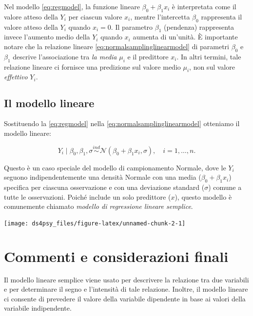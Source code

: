 \documentclass[
  11pt,
]{krantz}
\theoremstyle{definition}
\theoremstyle{definition}
\theoremstyle{definition}
\theoremstyle{definition}
\theoremstyle{remark}
\begin{document}
Nel modello \eqref{eq:regmodel}, la funzione lineare \(\beta_0 + \beta_ 1 x_i\) è interpretata come il valore atteso della \(Y_i\) per ciascun valore \(x_i\), mentre l'intercetta \(\beta_0\) rappresenta il valore atteso della \(Y_i\) quando \(x_i = 0\). Il parametro \(\beta_ 1\) (pendenza) rappresenta invece l'aumento medio della \(Y_i\) quando \(x_i\) aumenta di un'unità. È importante notare che la relazione lineare \eqref{eq:normalsamplinglinearmodel} di parametri \(\beta_0\) e \(\beta_ 1\) descrive l'associazione tra \emph{la media} \(\mu_i\) e il predittore \(x_i\). In altri termini, tale relazione lineare ci fornisce una predizione sul valore medio \(\mu_i\), non sul valore \emph{effettivo} \(Y_i\).

\hypertarget{il-modello-lineare}{%
\subsection{Il modello lineare}\label{il-modello-lineare}}

Sostituendo la \eqref{eq:regmodel} nella \eqref{eq:normalsamplinglinearmodel} otteniamo il modello lineare:

\begin{equation}
Y_i \mid \beta_0, \beta_ 1, \sigma \stackrel{ind}{\sim} \mathcal{N}(\beta_0 + \beta_ 1 x_i, \sigma), \quad i = 1, \dots, n.
\label{eq:samplinglinearmodel}
\end{equation}

Questo è un caso speciale del modello di campionamento Normale, dove le \(Y_i\) seguono indipendentemente una densità Normale con una media (\(\beta_0 + \beta_ 1 x_i\)) specifica per ciascuna osservazione e con una deviazione standard (\(\sigma\)) comune a tutte le osservazioni. Poiché include un solo predittore (\(x\)), questo modello è comunemente chiamato \emph{modello di regressione lineare semplice}.

\begin{center}\texttt{[image: ds4psy\_files/figure-latex/unnamed-chunk-2-1]} \end{center}

\hypertarget{commenti-e-considerazioni-finali}{%
\section*{Commenti e considerazioni finali}\label{commenti-e-considerazioni-finali}}


Il modello lineare semplice viene usato per descrivere la relazione tra due variabili e per determinare il segno e l'intensità di tale relazione. Inoltre, il modello lineare ci consente di prevedere il valore della variabile dipendente in base ai valori della variabile indipendente.
\end{document}
